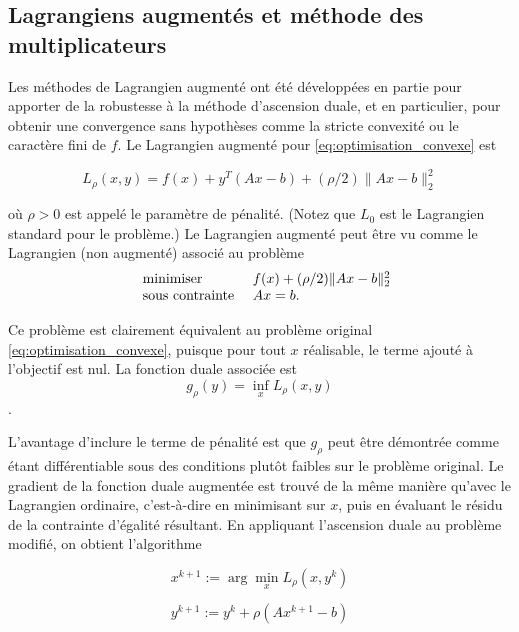 \subsection{Lagrangiens augmentés et méthode des multiplicateurs}
Les méthodes de Lagrangien augmenté ont été développées en partie pour apporter de la robustesse à la méthode d'ascension duale, et en particulier, pour obtenir une convergence sans hypothèses comme la stricte convexité ou le caractère fini de \( f \). Le Lagrangien augmenté pour \eqref{eq:optimisation_convexe} est

\begin{equation}
L_\rho(x, y) = f(x) + y^T(Ax - b) + (\rho/2)\|Ax - b\|_2^2
    \label{eq:lagrangien_augmente}
\end{equation}

où \( \rho > 0 \) est appelé le paramètre de pénalité. (Notez que \( L_0 \) est le Lagrangien standard pour le problème.) Le Lagrangien augmenté peut être vu comme le Lagrangien (non augmenté) associé au problème
\begin{equation}
    \begin{array}{ l l l}
        &\text{minimiser }& f(x) + (\rho/2)\|Ax - b\|_2^2\\
        &\text{sous contrainte }& Ax = b.
    \end{array}
\end{equation}


Ce problème est clairement équivalent au problème original \eqref{eq:optimisation_convexe}, puisque pour tout \( x \) réalisable, le terme ajouté à l'objectif est nul. La fonction duale associée est \begin{equation}g_\rho(y) = \inf_x L_\rho(x, y)\end{equation}.

L'avantage d'inclure le terme de pénalité est que \( g_\rho \) peut être démontrée comme étant différentiable sous des conditions plutôt faibles sur le problème original. Le gradient de la fonction duale augmentée est trouvé de la même manière qu'avec le Lagrangien ordinaire, c'est-à-dire en minimisant sur \( x \), puis en évaluant le résidu de la contrainte d'égalité résultant. En appliquant l'ascension duale au problème modifié, on obtient l'algorithme

\begin{equation}
x^{k+1} := \arg\min_x L_\rho(x, y^k)
\label{eq:methodes_multiplicateurs1}
\end{equation}

\begin{equation}
y^{k+1} := y^k + \rho (Ax^{k+1} - b)
\label{eq:methodes_multiplicateurs2}
\end{equation}

